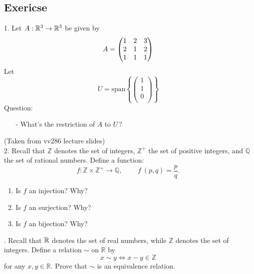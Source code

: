 \documentclass[12pt]{article}
\begin{document}
\subsection{Exericse}
    1. Let $A: \mathbb{R}^3 \to \mathbb{R}^3 $ be given by
    $$A=\begin{pmatrix} 1 &2 &3 \\ 2 &1 &2 \\ 1 &1 &1 \\ \end{pmatrix}$$
    Let 
    $$U=\text{span} {\left \{\begin{pmatrix}1\\1\\0\\\end{pmatrix}\right \} }$$
    Question:
    \begin{itemize}
        \item[-]What's the restriction of $A$ to $U\,$? 
    \end{itemize}
    (Taken from vv286 lecture slides)
    \vspace{1em}\\
    2. Recall that $\mathbb{Z}$ denotes the set of integers, $\mathbb{Z}^+$ the set of positive integers, and $\mathbb{Q}$ the set of rational numbers. 
    Define a function: 
    \begin{equation*}
    f: \mathbb{Z} \times \mathbb{Z}^+ \to \mathbb{Q},~~~~~~~~~~
    f~(p,q) = \frac{p}{q}.
    \end{equation*}
    \begin{enumerate}
    	\item Is $f$ an injection? Why?
    	\item Is $f$ an surjection? Why?
    	\item Is $f$ an bijection? Why?
    \end{enumerate}
    . Recall that $\mathbb{R}$ denotes the set of real numbers, while $\mathbb{Z}$ denotes the set of integers. 
    Define a relation $\sim$ on $\mathbb{R}$ by
    \begin{equation*}
        x \sim y \Leftrightarrow x - y \in \mathbb{Z}
    \end{equation*}
    for any $x, y \in \mathbb{R}$. Prove that $\sim$ is an equivalence relation.
\end{document}
